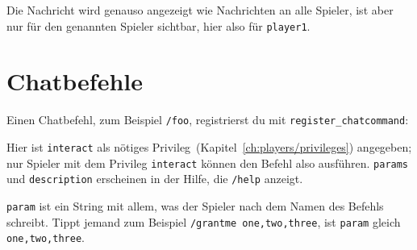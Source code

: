 \begin{Shaded}
\begin{Highlighting}[]
\OperatorTok{(}
    \OperatorTok{,}
\OperatorTok{)}
\end{Highlighting}
\end{Shaded}

Die Nachricht wird genauso angezeigt wie Nachrichten an alle Spieler,
ist aber nur für den genannten Spieler sichtbar, hier also für
\texttt{player1}.

\section{Chatbefehle}\label{chatbefehle}

Einen Chatbefehl, zum Beispiel \texttt{/\allowbreak{}foo}, registrierst
du mit \texttt{register\_\allowbreak{}chatcommand}:

\begin{Shaded}
\begin{Highlighting}[]
\OperatorTok{(}\OperatorTok{,} \OperatorTok{\{}
     \OperatorTok{=} \OperatorTok{,}
     \OperatorTok{=} \OperatorTok{,}
     \OperatorTok{=} \OperatorTok{\{}
         \OperatorTok{=} \OperatorTok{,}
    \OperatorTok{\},}
     \OperatorTok{=} \OperatorTok{(}\OperatorTok{,} \OperatorTok{)}
         \OperatorTok{,}     
    \OperatorTok{,}
\OperatorTok{\})}
\end{Highlighting}
\end{Shaded}

Hier ist \texttt{interact} als nötiges
Privileg~(Kapitel~\ref{ch:players/privileges})
angegeben; nur Spieler mit dem Privileg \texttt{interact} können den
Befehl also ausführen. \texttt{params} und \texttt{description}
erscheinen in der Hilfe, die \texttt{/\allowbreak{}help} anzeigt.

\texttt{param} ist ein String mit allem, was der Spieler nach dem Namen
des Befehls schreibt. Tippt jemand zum Beispiel
\texttt{/\allowbreak{}grantme one,two,three}, ist \texttt{param} gleich
\texttt{one,two,three}.

